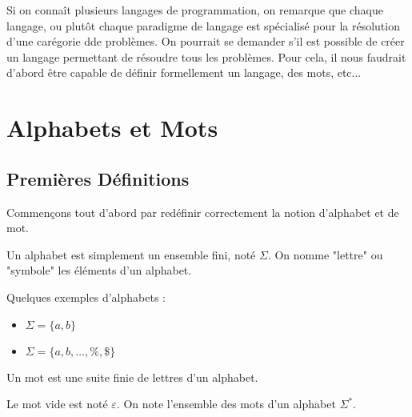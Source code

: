 \minitoc %


Si on connaît plusieurs langages de programmation, on remarque que chaque langage, ou plutôt chaque paradigme de 
langage est spécialisé pour la résolution d'une carégorie dde problèmes. 
On pourrait se demander s'il est possible de créer un langage permettant de résoudre tous les problèmes. 
Pour cela, il nous faudrait d'abord être capable de définir formellement un langage, des mots, etc... 


\section{Alphabets et Mots}

\subsection{Premières Définitions}

Commençons tout d'abord par redéfinir correctement la notion d'alphabet et de mot. 

\begin{definition}[Alphabet]
    Un alphabet est simplement un ensemble fini, noté $\Sigma$.
    On nomme "lettre" ou "symbole" les éléments d'un alphabet.  
\end{definition}

\begin{example}
    Quelques exemples d'alphabets :
    \begin{itemize}
        \item $\Sigma = \{a,b\}$ 
        \item $\Sigma = \{a,b,\dots,\text{\%},\text{\$}\}$
    \end{itemize}
\end{example}

\begin{definition}[Mot]
    Un mot est une suite finie de lettres d'un alphabet. 
\end{definition}

\begin{proposition}
    Le mot vide est noté $\varepsilon$. On note l'ensemble des mots d'un alphabet $\Sigma^*$. 
\end{proposition}

